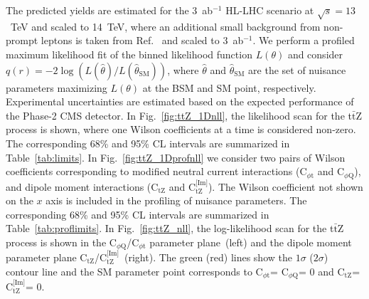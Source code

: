 \documentclass[letterpaper,11pt]{article}
\def\ttZ{t$\bar{\text{t}}$Z\xspace}
\def\ctZ{C$_\text{tZ}$\xspace}
\def\ctZI{C$_\text{tZ}^\text{[Im]}$\xspace}
\def\cpt{C$_{\phi \text{t}}$\xspace}
\def\cpQM{C$_{\phi \text{Q}}$\xspace}
\def\TeV{TeV\xspace}
\begin{document}
The predicted yields are estimated for the 3~ab${}^{-1}$ HL-LHC scenario at $\sqrt{s}=13$~\TeV and scaled to 14~\TeV, where an additional small background from non-prompt leptons is taken from Ref.~\cite{Sirunyan:2017uzs} and scaled to 3~ab${}^{-1}$.
We perform a profiled maximum likelihood fit of the binned likelihood function $L(\theta)$ and consider $q(r)=-2\log(L(\hat{\theta})/L(\hat{\theta}_{\textrm{SM}}))$, where $\hat{\theta}$ and
$\hat{\theta}_\textrm{SM}$ are the set of nuisance parameters maximizing $L(\theta)$ at the BSM and SM point, respectively.
Experimental uncertainties are estimated based on the expected performance of the Phase-2 CMS detector.
In Fig.~\ref{fig:ttZ_1Dnll}, the likelihood scan for the \ttZ process is shown, where one Wilson coefficients at a time is considered non-zero.
The corresponding 68\% and 95\% CL intervals are summarized in Table~\ref{tab:limits}.
In Fig.~\ref{fig:ttZ_1Dprofnll} we consider two pairs of Wilson coefficients corresponding to modified neutral current interactions (\cpt and \cpQM), and dipole moment interactions (\ctZ and \ctZI).
The Wilson coefficient not shown on the $x$ axis is included in the profiling of nuisance parameters.
The corresponding 68\% and 95\% CL intervals are summarized in Table~\ref{tab:proflimits}.
In Fig.~\ref{fig:ttZ_nll}, the log-likelihood scan for the \ttZ process is shown in the \cpQM/\cpt parameter plane~(left) and the dipole moment parameter plane \ctZ/\ctZI~(right).
The green (red) lines show the $1\sigma$ ($2\sigma$) contour line and the SM parameter point corresponds to \cpt = \cpQM = 0 and \ctZ = \ctZI = 0.
\end{document}
